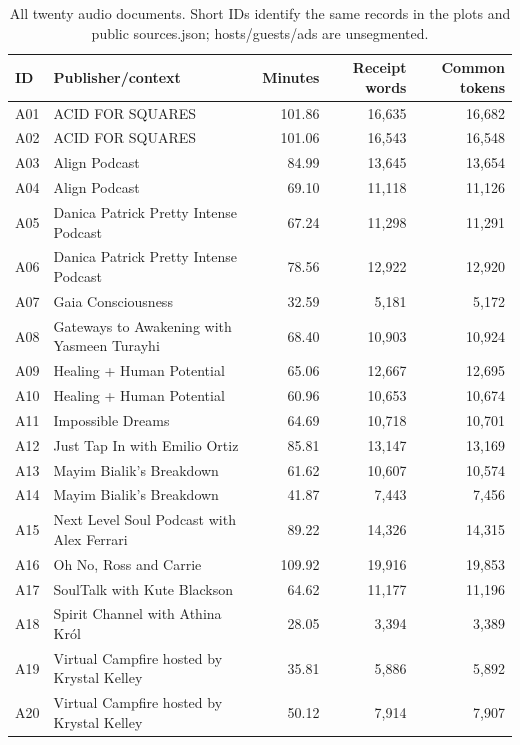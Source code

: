 \begin{table}[t]
\centering\small
\begin{tabular}{lp{}rrr}
\toprule
ID & Publisher/context & Minutes & Receipt words & Common tokens\\
\midrule
A01 & ACID FOR SQUARES & 101.86 & 16,635 & 16,682\\
A02 & ACID FOR SQUARES & 101.06 & 16,543 & 16,548\\
A03 & Align Podcast & 84.99 & 13,645 & 13,654\\
A04 & Align Podcast & 69.10 & 11,118 & 11,126\\
A05 & Danica Patrick Pretty Intense Podcast & 67.24 & 11,298 & 11,291\\
A06 & Danica Patrick Pretty Intense Podcast & 78.56 & 12,922 & 12,920\\
A07 & Gaia Consciousness & 32.59 & 5,181 & 5,172\\
A08 & Gateways to Awakening with Yasmeen Turayhi & 68.40 & 10,903 & 10,924\\
A09 & Healing + Human Potential & 65.06 & 12,667 & 12,695\\
A10 & Healing + Human Potential & 60.96 & 10,653 & 10,674\\
A11 & Impossible Dreams & 64.69 & 10,718 & 10,701\\
A12 & Just Tap In with Emilio Ortiz & 85.81 & 13,147 & 13,169\\
A13 & Mayim Bialik's Breakdown & 61.62 & 10,607 & 10,574\\
A14 & Mayim Bialik's Breakdown & 41.87 & 7,443 & 7,456\\
A15 & Next Level Soul Podcast with Alex Ferrari & 89.22 & 14,326 & 14,315\\
A16 & Oh No, Ross and Carrie & 109.92 & 19,916 & 19,853\\
A17 & SoulTalk with Kute Blackson & 64.62 & 11,177 & 11,196\\
A18 & Spirit Channel with Athina Król & 28.05 & 3,394 & 3,389\\
A19 & Virtual Campfire hosted by Krystal Kelley & 35.81 & 5,886 & 5,892\\
A20 & Virtual Campfire hosted by Krystal Kelley & 50.12 & 7,914 & 7,907\\
\bottomrule
\end{tabular}
\caption{All twenty audio documents. Short IDs identify the same records in the plots and public sources.json; hosts/guests/ads are unsegmented.}
\end{table}

